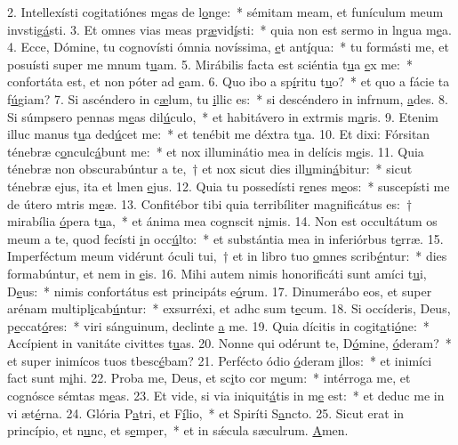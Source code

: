2. Intellexísti cogitatiónes m\uline{e}as de l\uline{o}nge:~* sémitam meam, et funículum meum invstig\uline{á}sti.
3. Et omnes vias meas pr\uline{æ}vid\uline{í}sti:~* quia non est sermo in lngua m\uline{e}a.
4. Ecce, Dómine, tu cognovísti ómnia novíssima, \uline{e}t ant\uline{í}qua:~* tu formásti me, et posuísti super me mnum t\uline{u}am.
5. Mirábilis facta est sciéntia t\uline{u}a \uline{e}x me:~* confortáta est, et non póter ad \uline{e}am.
6. Quo ibo a sp\uline{í}ritu t\uline{u}o?~* et quo a fácie ta f\uline{ú}giam?
7. Si ascéndero in c\uline{æ}lum, tu \uline{i}llic es:~* si descéndero in infrnum, \uline{a}des.
8. Si súmpsero pennas m\uline{e}as dil\uline{ú}culo,~* et habitávero in extrmis m\uline{a}ris.
9. Etenim illuc manus t\uline{u}a ded\uline{ú}cet me:~* et tenébit me déxtra t\uline{u}a.
10. Et dixi: Fórsitan ténebræ c\uline{o}nculc\uline{á}bunt me:~* et nox illuminátio mea in delícis m\uline{e}is.
11. Quia ténebræ non obscurabúntur a te,~† et nox sicut dies ill\uline{u}min\uline{á}bitur:~* sicut ténebræ ejus, ita et lmen \uline{e}jus.
12. Quia tu possedísti r\uline{e}nes m\uline{e}os:~* suscepísti me de útero mtris m\uline{e}æ.
13. Confitébor tibi quia terribíliter magnificátus es:~† mirabília \uline{ó}pera t\uline{u}a,~* et ánima mea cognscit n\uline{i}mis.
14. Non est occultátum os meum a te, quod fecísti \uline{i}n occ\uline{ú}lto:~* et substántia mea in inferiórbus t\uline{e}rræ.
15. Imperféctum meum vidérunt óculi tui,~† et in libro tuo \uline{o}mnes scrib\uline{é}ntur:~* dies formabúntur, et nem in \uline{e}is.
16. Mihi autem nimis honorificáti sunt amíci t\uline{u}i, D\uline{e}us:~* nimis confortátus est principáts e\uline{ó}rum.
17. Dinumerábo eos, et super arénam multipl\uline{i}cab\uline{ú}ntur:~* exsurréxi, et adhc sum t\uline{e}cum.
18. Si occíderis, Deus, p\uline{e}ccat\uline{ó}res:~* viri sánguinum, declinte \uline{a} me.
19. Quia dícitis in cogit\uline{a}ti\uline{ó}ne:~* Accípient in vanitáte civittes t\uline{u}as.
20. Nonne qui odérunt te, D\uline{ó}mine, \uline{ó}deram?~* et super inimícos tuos tbesc\uline{é}bam?
21. Perfécto ódio \uline{ó}deram \uline{i}llos:~* et inimíci fact sunt m\uline{i}hi.
22. Proba me, Deus, et sc\uline{i}to cor m\uline{e}um:~* intérroga me, et cognósce sémtas m\uline{e}as.
23. Et vide, si via iniquit\uline{á}tis in m\uline{e} est:~* et deduc me in vi æt\uline{é}rna.
24. Glória P\uline{a}tri, et F\uline{í}lio,~* et Spiríti S\uline{a}ncto.
25. Sicut erat in princípio, et n\uline{u}nc, et s\uline{e}mper,~* et in sǽcula sæculrum. \uline{A}men.
